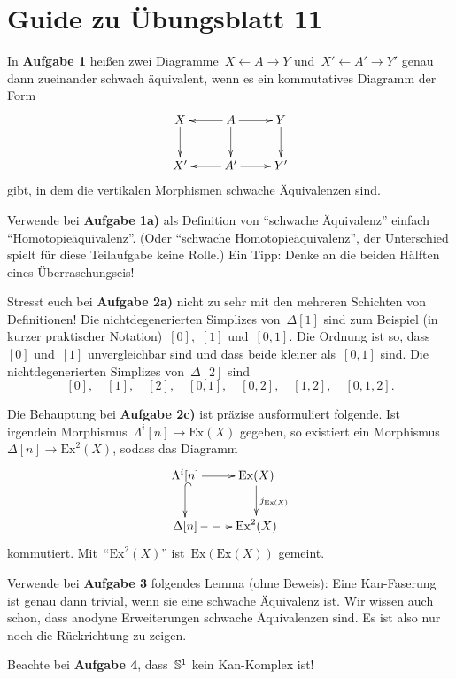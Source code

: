 \documentclass{uebblatt}
\begin{document}
\section*{Guide zu Übungsblatt 11}

In \textbf{Aufgabe 1} heißen zwei Diagramme~$X \leftarrow A \rightarrow Y$
und~$X' \leftarrow A' \rightarrow Y'$ genau dann zueinander schwach äquivalent,
wenn es ein kommutatives Diagramm der Form
\[ \xymatrix{
  X \ar[d] & A \ar[l]\ar[r] \ar[d] & Y \ar[d] \\
  X' & A' \ar[l]\ar[r] & Y'
} \]
gibt, in dem die vertikalen Morphismen schwache Äquivalenzen sind.

Verwende bei \textbf{Aufgabe 1a)} als Definition von "`schwache Äquivalenz"'
einfach "`Homotopieäquivalenz"'. (Oder "`schwache Homotopieäquivalenz"', der
Unterschied spielt für diese Teilaufgabe keine Rolle.) Ein Tipp: Denke an die
beiden Hälften eines Überraschungseis!

Stresst euch bei \textbf{Aufgabe 2a)} nicht zu sehr mit den mehreren Schichten
von Definitionen! Die nichtdegenerierten Simplizes von~$\Delta[1]$ sind zum
Beispiel (in kurzer praktischer Notation)~$[0]$,~$[1]$ und~$[0,1]$. Die Ordnung ist
so, dass~$[0]$ und~$[1]$ unvergleichbar sind und dass beide kleiner als~$[0,1]$
sind. Die nichtdegenerierten Simplizes von~$\Delta[2]$ sind
\[
  [0], \quad
  [1], \quad
  [2], \quad
  [0,1], \quad
  [0,2], \quad
  [1,2], \quad
  [0,1,2].
\]

Die Behauptung bei \textbf{Aufgabe 2c)} ist präzise ausformuliert folgende. Ist
irgendein Morphismus~$\Lambda^i[n] \to \mathrm{Ex}(X)$ gegeben, so existiert
ein Morphismus~$\Delta[n] \to \mathrm{Ex}^2(X)$, sodass das Diagramm
\[ \xymatrix{
  \Lambda^i[n] \ar[r] \ar@{^{(}->}[d] & \mathrm{Ex}(X) \ar[d]^{j_{\mathrm{Ex}(X)}} \\
  \Delta[n] \ar@{-->}[r] & \mathrm{Ex}^2(X)
} \]
kommutiert. Mit~"`$\mathrm{Ex}^2(X)$"' ist~$\mathrm{Ex}(\mathrm{Ex}(X))$ gemeint.

Verwende bei \textbf{Aufgabe 3} folgendes Lemma (ohne Beweis): Eine
Kan-Faserung ist genau dann trivial, wenn sie eine schwache Äquivalenz ist.
Wir wissen auch schon, dass anodyne Erweiterungen schwache Äquivalenzen sind.
Es ist also nur noch die Rückrichtung zu zeigen.

Beachte bei \textbf{Aufgabe 4}, dass~$\mathbb{S}^1$ kein Kan-Komplex ist!
\end{document}
